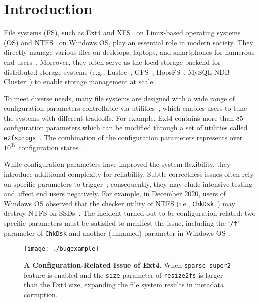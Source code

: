 \section{Introduction}
\label{sec:intro}

File systems (FS), such as Ext4 \cite{ext4} and XFS~\cite{XFS} on Linux-based  operating systems (OS) and NTFS~\cite{ntfs} on Windows OS, play an essential role in modern society.
They directly manage various files on desktops, laptops, and smartphones for numerous end users~\cite{Lu-FAST13-FS}. Moreover,
they often serve as the local storage backend for distributed storage systems (e.g., Lustre~\cite{lustre}, GFS~\cite{GoogleFS}, HopsFS~\cite{Hopfs}, MySQL NDB Cluster~\cite{mysqlndb}) to enable  storage management at scale.

To meet diverse needs, many file systems are designed with a wide range of configuration parameters controllable via  utilities~\cite{e2fsprogs,xfsprogs,btrfsbalance,fsckufs,zfsset,fsckminix,chkdsk,diskutil}, 
which enables   users to tune the systems with different tradeoffs.
For example,   Ext4 contains more than 85 configuration parameters which can be modified through a set of utilities called \texttt{e2fsprogs}~\cite{e2fsprogs}. The combination of the configuration parameters represents over $10^{37}$   configuration states~\cite{Carver}.


While configuration parameters have  improved the system flexibility, they introduce additional complexity for reliability. 
Subtle correctness issues often rely on specific parameters to trigger~\cite{confu, spex};  
consequently, they may elude  intensive testing  and affect  end users negatively.
For example, in December 2020, users of Windows OS observed that the checker utility of  NTFS (i.e., \texttt{ChkDsk}~\cite{chkdsk}) may  destroy NTFS on SSDs~\cite{hothardware20201220,borns20201218}. 
The incident turned out to be configuration-related: 
 two specific parameters must be satisfied to manifest the issue, including the `\texttt{/f}' parameter of \texttt{ChkDsk} and another (unnamed)  parameter in Windows OS~\cite{borns20201221}.
 
 
 \begin{figure}[tb]
	\centering
 \texttt{[image: ./bugexample]}
	\caption{  {\bf A Configuration-Related Issue of Ext4}.  { When \texttt{sparse\_super2} feature is enabled and the \texttt{size} parameter of \texttt{resize2fs} is larger than the Ext4 size, expanding the file system results in metadata corruption.  
	}}
	\label{fig:resizebug}
\end{figure}

